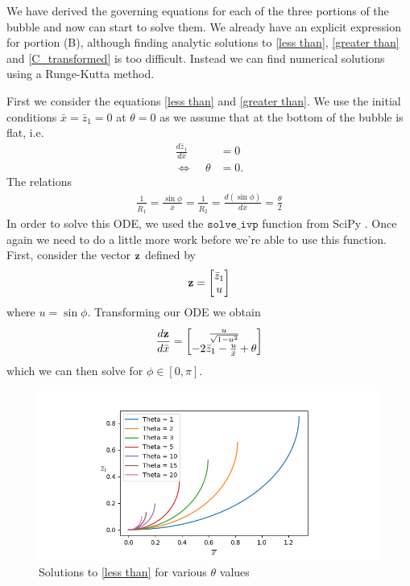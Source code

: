 We have derived the governing equations for each of the three portions of the bubble and now can start to solve them. We already have an explicit expression for portion (B), although finding analytic solutions to \ref{less than}, \ref{greater than} and \ref{C_transformed} is too difficult. Instead we can find numerical solutions using a Runge-Kutta method.

First we consider the equations \ref{less than} and \ref{greater than}. We use the initial conditions $\bar{x}=\bar{z}_1=0$ at $\theta=0$ as we assume that at the bottom of the bubble is flat, i.e.
\begin{align}
    \frac{d\bar{z}_1}{d\bar{x}}&=0\\
    \Leftrightarrow \:\:\:\:\:\theta&=0.
\end{align}
The relations
\begin{align}
    \frac{1}{\bar{R}_1}=\frac{\sin\phi}{\bar{x}}=\frac{1}{\bar{R}_2}=\frac{d(\sin\phi)}{d\bar{x}}=\frac{\theta}{2}
\end{align}
In order to solve this ODE, we used the $\texttt{solve\_ivp}$ function from SciPy \cite{2020SciPy-NMeth}. Once again we need to do a little more work before we're able to use this function. First, consider the vector $\bf{z}$ defined by
\begin{align}
    \bf{z} = \begin{bmatrix}
           \bar{z}_1 \\
           u \\
         \end{bmatrix}
\end{align}
where $u=\sin \phi$. Transforming our ODE we obtain
\begin{align}
    \frac{d\bf{z}}{d\bar{x}}=\begin{bmatrix}
           \frac{u}{\sqrt{1-u^2}} \\
           -2\bar{z}_1 - \frac{u}{\bar{x}}+\theta \\
         \end{bmatrix}
\end{align}
which we can then solve for $\phi \in [0,\pi]$.
\begin{figure}[hb]
    \centering
    \includegraphics[width=0.85\linewidth]{WriteUp/images/bottom curve.png}
    \caption{Solutions to \ref{less than} for various $\theta$ values}
    \label{fig:9}
\end{figure}
